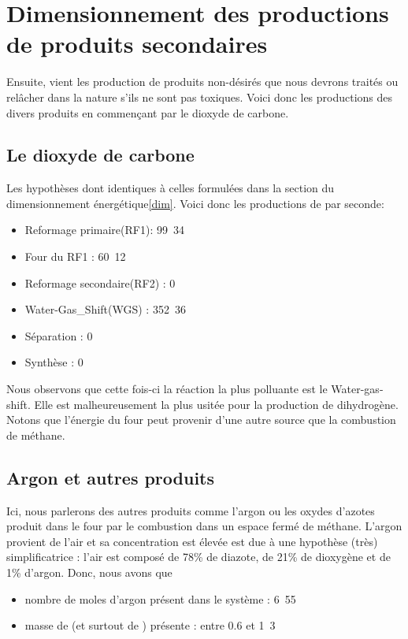 \section{Dimensionnement des productions de produits secondaires}

Ensuite, vient les production de produits non-désirés que nous devrons traités ou relâcher dans la nature s'ils ne sont pas toxiques. Voici donc les productions des divers produits en commençant par le dioxyde de carbone.

\subsection{Le dioxyde de carbone}

Les hypothèses dont identiques à celles formulées dans la section du dimensionnement énergétique\ref{dim}. Voici donc les productions de  par seconde:

\begin{itemize}
	\item Reformage primaire(RF1): \unit{99.34}{\mole}\\
	\item Four du RF1 : \unit{60.12}{\mole}\\
	\item Reformage secondaire(RF2) : \unit{0}{\mole}\\
	\item Water-Gas_Shift(WGS) : \unit{352.36}{\mole}\\
	\item Séparation : \unit{0}{\mole}\\
	\item Synthèse : \unit{0}{\mole}\\
\end{itemize}

Nous observons que cette fois-ci la réaction la plus polluante est le Water-gas-shift. Elle est malheureusement la plus usitée pour la production de dihydrogène. Notons que l'énergie du four peut provenir d'une autre source que la combustion de méthane.

\subsection{Argon et autres produits}

Ici, nous parlerons des autres produits comme l'argon ou les oxydes d'azotes produit dans le four par le combustion dans un espace fermé de méthane. L'argon provient de l'air et sa concentration est élevée est due à une hypothèse (très) simplificatrice : l'air est composé de 78\% de diazote, de 21\% de dioxygène et de 1\% d'argon. Donc, nous avons que
\begin{itemize}
	\item nombre de moles d'argon présent dans le système : \unit{6.55}{\mole\per\second}
	\item masse de  (et surtout de ) présente : entre 0.6 et \unit{1.3}{\ton\per\second}
\end{itemize}

